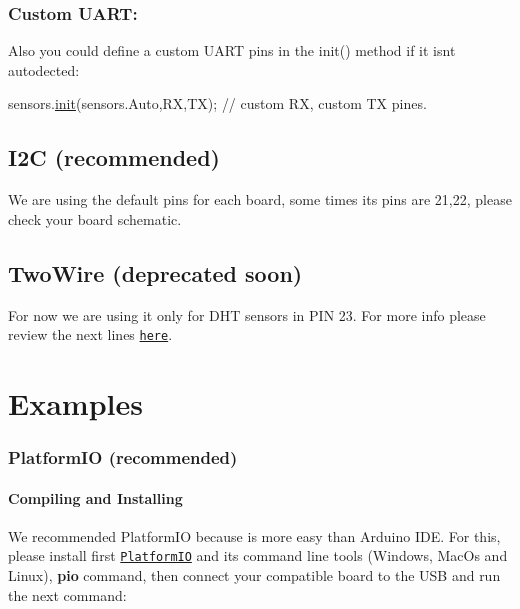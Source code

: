 \subsubsection*{Custom U\+A\+RT\+:}

Also you could define a custom U\+A\+RT pins in the init() method if it isn\textquotesingle{}t autodected\+:


\begin{DoxyCode}
sensors.\hyperlink{classSensors_a019efdf3e65081e9ace94e1f05338e4b}{init}(sensors.Auto,RX,TX); \textcolor{comment}{// custom RX, custom TX pines.}
\end{DoxyCode}


\subsection*{I2C (recommended)}

We are using the default pins for each board, some times it\textquotesingle{}s pins are 21,22, please check your board schematic.

\subsection*{Two\+Wire (deprecated soon)}

For now we are using it only for D\+HT sensors in P\+IN 23. For more info please review the next lines \href{https://github.com/kike-canaries/canairio_sensorlib/blob/master/src/Sensors.hpp#L19-L52}{\tt here}.

\section*{Examples}

\subsubsection*{Platform\+IO (recommended)}

\paragraph*{Compiling and Installing}

We recommended Platform\+IO because is more easy than Arduino I\+DE. For this, please install first \href{http://platformio.org/}{\tt Platform\+IO} and its command line tools (Windows, Mac\+Os and Linux), {\bfseries pio} command, then connect your compatible board to the U\+SB and run the next command\+:


